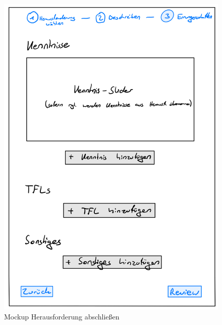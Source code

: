 \documentclass[
  12pt,
  ngerman,
  a4paper,
]{article}
\begin{document}
\begin{figure}
\centering
\includegraphics{./tex2pdf.-930e6666e1221838/64e8eb4d895a9ea30177631848ba4333e18fb5a7.jpg}
\caption{Mockup Herausforderung abschließen}
\end{figure}
\end{document}
